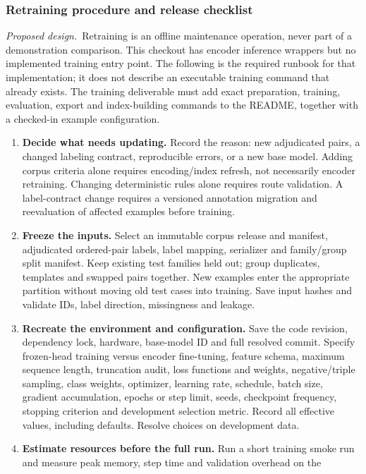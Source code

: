 \documentclass[10pt,letterpaper]{article}
\newcommand{\planned}{\textit{Proposed design.}}
\begin{document}
\subsubsection{Retraining procedure and release checklist}
\label{sec:retraining}
\planned\ Retraining is an offline maintenance operation, never part of a
demonstration comparison. This checkout has encoder inference wrappers but
no implemented training entry point. The following is the required runbook
for that implementation; it does not describe an executable training command
that already exists. The training deliverable must add exact preparation,
training, evaluation, export and index-building commands to the README,
together with a checked-in example configuration.

\begin{enumerate}
\item \textbf{Decide what needs updating.} Record the reason: new adjudicated
pairs, a changed labeling contract, reproducible errors, or a new base model.
Adding corpus criteria alone requires encoding/index refresh, not necessarily
encoder retraining. Changing deterministic rules alone requires route
validation. A label-contract change requires a versioned annotation migration
and reevaluation of affected examples before training.
\item \textbf{Freeze the inputs.} Select an immutable corpus release and
manifest, adjudicated ordered-pair labels, label mapping, serializer and
family/group split manifest. Keep existing test families held out; group
duplicates, templates and swapped pairs together. New examples enter the
appropriate partition without moving old test cases into training. Save
input hashes and validate IDs, label direction, missingness and leakage.
\item \textbf{Recreate the environment and configuration.} Save the code
revision, dependency lock, hardware, base-model ID and full resolved commit.
Specify frozen-head training versus encoder fine-tuning, feature schema,
maximum sequence length, truncation audit, loss functions and weights,
negative/triple sampling, class weights, optimizer, learning rate, schedule,
batch size, gradient accumulation, epochs or step limit, seeds, checkpoint
frequency, stopping criterion and development selection metric. Record all
effective values, including defaults. Resolve choices on development data.
\item \textbf{Estimate resources before the full run.} Run a short training
smoke run and measure peak memory, step time and validation overhead on the

\end{enumerate}
\end{document}
